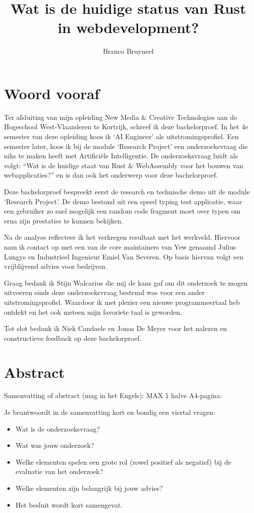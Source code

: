 \documentclass[11pt,a4paper,oneside]{book}
\author{Branco Bruyneel}
\title{Wat is de huidige status van Rust in webdevelopment?}
\begin{document}
\maketitle

\chapter*{Woord vooraf}
Ter afsluiting van mijn opleiding New Media \& Creative Technologies aan de
Hogeschool West-Vlaanderen te Kortrijk, schreef ik deze bachelorproef.  In het
4e semester van deze opleiding koos ik ‘AI Engineer’ als uitstromingsprofiel.
Een semester later, koos ik bij de module ‘Research Project’ een
onderzoeksvraag die niks te maken heeft met Artificiële Intelligentie. De
onderzoeksvraag luidt als volgt: “Wat is de huidige staat van Rust \&
WebAssembly voor het bouwen van webapplicaties?” en is dan ook het onderwerp
voor deze bachelorproef. 

Deze bachelorproef bespreekt eerst de research en technische demo uit de module
‘Research Project’. De demo bestond uit een speed typing test applicatie, waar
een gebruiker zo snel mogelijk een random code fragment moet over typen om erna
zijn prestaties te kunnen bekijken. 

Na de analyse reflecteer ik het verkregen resultaat met het werkveld. Hiervoor
nam ik contact op met een van de core maintainers van Yew genaamd Julius Lungys
en Industrieel Ingenieur Emiel Van Severen. Op basis hiervan volgt een
vrijblijvend advies voor bedrijven. 

Graag bedank ik Stijn Walcarius die mij de kans gaf om dit onderzoek te mogen
uitvoeren sinds deze onderzoeksvraag bestemd was voor een ander
uitstromingsprofiel. Waardoor ik met plezier een nieuwe programmeertaal heb
ontdekt en het ook meteen mijn favoriete taal is geworden. 

Tot slot bedank ik Niek Candaele en Jonas De Meyer voor het nalezen en
constructieve feedback op deze bachelorproef.

\chapter*{Abstract}
Samenvatting of abstract (mag in het Engels): MAX 1 halve A4-pagina:  

Je beantwoordt in de samenvatting kort en bondig een viertal vragen:  
\begin{itemize}
  \item Wat is de onderzoeksvraag? 
  \item Wat was jouw onderzoek?  
  \item Welke elementen spelen een grote rol (zowel positief als negatief) bij
    de evaluatie van het onderzoek?  
  \item Welke elementen zijn belangrijk bij jouw advies? 
  \item Het besluit wordt kort samengevat.
\end{itemize}

\tableofcontents
{}

\listoffigures









\end{document}

